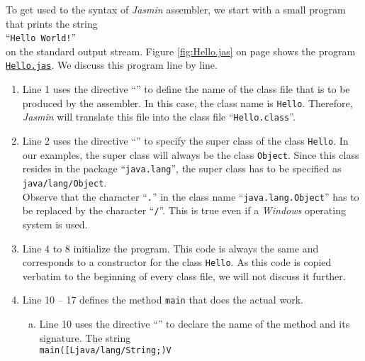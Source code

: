 To get used to the syntax of \textsl{Jasmin} assembler, we start with a small program that prints the
string
\\[0.2cm]
\hspace*{1.3cm}
``\texttt{Hello World!}''
\\[0.2cm]
on the standard output stream.  Figure \ref{fig:Hello.jas} on page
\pageref{fig:Hello.jas} shows the program
\href{https://github.com/karlstroetmann/Formal-Languages/tree/master/Jasmin/Hello.jas}{\texttt{Hello.jas}}. 
We discuss this program line by line.
\begin{enumerate}
\item Line 1 uses the directive ``\texttt{}'' to define the name of the class file that is to
      be produced by the assembler.  
      In this case, the class name is \texttt{Hello}.  Therefore, \textsl{Jasmin} will translate
      this file into the class file ``\texttt{Hello.class}''.
\item Line 2 uses the directive ``\texttt{}'' to specify the super class of the class
      \texttt{Hello}.  In our examples, the super class will always be the class \texttt{Object}.
      Since this class resides in the package ``\texttt{java.lang}'', the super class has to be
      specified as 
      \\[0.2cm]
      \hspace*{1.3cm}
      \texttt{java/lang/Object}.
      \\[0.2cm]
      Observe that the character ``\texttt{.}'' in the class name ``\texttt{java.lang.Object}''
      has to be replaced by the character ``\texttt{/}''.  This is true even if a \textsl{Windows}
      operating system is used.
\item Line 4 to 8 initialize the program.  This code is always the same and corresponds to a
      constructor for the class \texttt{Hello}.  As this code is copied verbatim to the beginning 
      of every class file, we will not discuss it further. 
\item Line 10 -- 17 defines the method \texttt{main} that does the actual work.
  \begin{enumerate}[(a)]
  \item Line 10 uses the directive ``\texttt{}'' to declare the name of the method and its
        signature.  The string 
        \\[0.2cm]
        \hspace*{1.3cm}
        \texttt{main([Ljava/lang/String;)V}
        \\[0.2cm]

\end{enumerate}
\end{enumerate}
